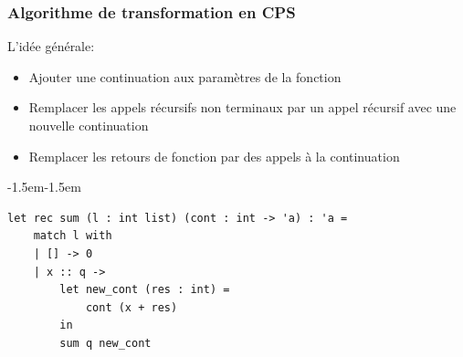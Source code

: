 \addtocounter{framenumber}{-1}
\begin{frame}[fragile,t]
    \frametitle{Algorithme de transformation en CPS}

    L'idée générale:
    \begin{itemize}
        \item Ajouter une continuation aux paramètres de la fonction
        \item Remplacer les appels récursifs non terminaux par un appel récursif
              avec une nouvelle continuation
        \item[\textcolor{orange}{$\blacktriangleright$}] Remplacer les retours de fonction par des appels à la continuation
    \end{itemize}

    \vspace{0.1cm}

    \begin{adjustwidth}{-1.5em}{-1.5em}
        \begin{verbatim}
let rec sum (l : int list) (cont : int -> 'a) : 'a =
    match l with
    | [] -> 0
    | x :: q -> 
        let new_cont (res : int) =
            cont (x + res)
        in
        sum q new_cont
        \end{verbatim}
    \end{adjustwidth}

\end{frame}

